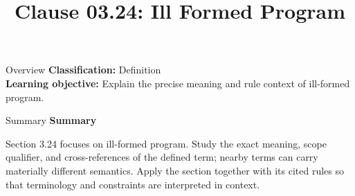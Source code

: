 \documentclass[10pt,letterpaper]{article}
\title{Clause 03.24: Ill Formed Program}
\author{}
\date{}
\begin{document}
\maketitle
\begin{CornellOverviewBox}{Overview}
\textbf{Classification:} Definition\\[2pt]
\textbf{Learning objective:} Explain the precise meaning and rule context of ill-formed program.
\end{CornellOverviewBox}\begin{CornellSummaryBox}{Summary}
{\sffamily\bfseries\color{Accent} Summary}\par\vspace{3pt}Section 3.24 focuses on ill-formed program. Study the exact meaning, scope qualifier, and cross-references of the defined term; nearby terms can carry materially different semantics. Apply the section together with its cited rules so that terminology and constraints are interpreted in context.
\end{CornellSummaryBox}
\end{document}
